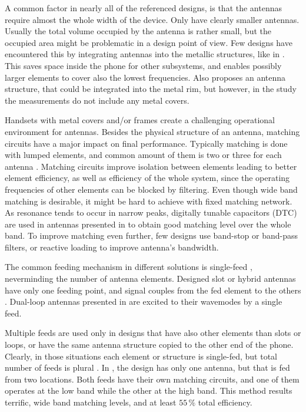 A common factor in nearly all of the referenced designs, is that the antennas require almost the whole width of the device. Only \cite{wu_pier,wu_tunable} have clearly smaller antennas. Usually the total volume occupied by the antenna is rather small, but the occupied area might be problematic in a design point of view. Few designs have encountered this by integrating antennas into the metallic structures, like in \cite{chen_metal_frame,lee_monopole,wu_tunable,zhong_pier}. This saves space inside the phone for other subsystems, and enables possibly larger elements to cover also the lowest frequencies. Also \cite{valkonen_multifeed} proposes an antenna structure, that could be integrated into the metal rim, but however, in the study the measurements do not include any metal covers.

Handsets with metal covers and/or frames create a challenging operational environment for antennas. Besides the physical structure of an antenna, matching circuits have a major impact on final performance. Typically matching is done with lumped elements, and common amount of them is two or three for each antenna \cite{stanley_lte_mimo, zhong_pier, wu_pier}. Matching circuits improve isolation between elements leading to better element efficiency, as well as efficiency of the whole system, since the operating frequencies of other elements can be blocked by filtering. Even though wide band matching is desirable, it might be hard to achieve with fixed matching network. As resonance tends to occur in narrow peaks, digitally tunable capacitors (DTC) are used in antennas presented in \cite{chen_compact_lte,wu_tunable} to obtain good matching level over the whole band. To improve matching even further, few designs use band-stop \cite{lee_monopole, wu_pier} or band-pass \cite{chen_metal_frame} filters, or reactive loading \cite{chen_compact_lte, chen_metal_frame} to improve antenna's bandwidth.

The common feeding mechanism in different solutions is single-feed \cite{wu_tunable, chen_metal_frame, lee_monopole, chen_compact_lte,hepta_ifa}, neverminding the number of antenna elements. Designed slot or hybrid antennas have only one feeding point, and signal couples from the fed element to the others \cite{son_wideband_mimo,hsu_compact,zhong_pier,yuan_slot}. Dual-loop antennas presented in \cite{stanley_lte_mimo,ban_dual_loop,hybrid} are excited to their wavemodes by a single feed.

Multiple feeds are used only in designs that have also other elements than slots or loops, or have the same antenna structure copied to the other end of the phone. Clearly, in those situations each element or structure is single-fed, but total number of feeds is plural \cite{stanley_lte_mimo, son_wideband_mimo,reconf_narrow}. In \cite{valkonen_multifeed}, the design has only one antenna, but that is fed from two locations. Both feeds have their own matching circuits, and one of them operates at the low band while the other at the high band. This method results terrific, wide band matching levels, and at least $55\,\%$ total efficiency.

